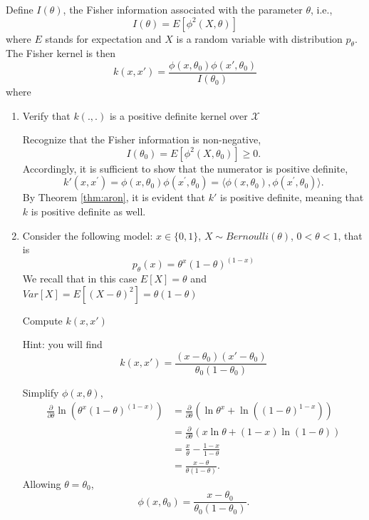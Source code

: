 \documentclass{article}[12pt]
\begin{document}
Define $I(\theta)$, the Fisher information associated with the parameter $\theta$, i.e., 
\begin{equation}
I(\theta)=E[\phi^2(X,\theta)]
\end{equation}
where $E$ stands for expectation and $X$ is a random variable with distribution $p_\theta$. 
The Fisher kernel is then 
\begin{equation}
k(x,x')=\frac{\phi(x,\theta_0)\phi(x',\theta_0)}{I(\theta_0)}
\end{equation}
where 
\begin{enumerate}
\item Verify that $k(.,.)$ is a positive definite kernel over $\mathcal{X}$

Recognize that the Fisher information is non-negative,
\begin{equation}
I(\theta_0)=E\left[\phi^{2}(X, \theta_0)\right] \ge 0.
\end{equation}
Accordingly, it is sufficient to show that the numerator is positive definite,
\begin{equation}
k'\left(x, x^{\prime}\right)=\phi\left(x, \theta_{0}\right) \phi\left(x^{\prime}, \theta_{0}\right) = \langle\phi\left(x, \theta_{0}\right), \phi\left(x^{\prime}, \theta_{0}\right) \rangle.
\end{equation}
By Theorem \ref{thm:aron}, it is evident that $k'$ is positive definite, meaning that $k$ is positive definite as well.

\item Consider the following model: $x \in \{0,1\}$, $X \sim Bernoulli(\theta)$, $0 < \theta < 1$, that is
\begin{equation}
p_\theta(x)=\theta^x(1-\theta)^{(1-x)} 
\end{equation}
We recall that in this case $E[X]=\theta$ and $Var[X]=E[(X-\theta)^2]=\theta(1-\theta)$

Compute $k(x,x')$

Hint: you will find $$k(x,x')=\frac{(x-\theta_0)(x'-\theta_0)}{\theta_0(1-\theta_0)}$$

Simplify $\phi(x, \theta)$,
\begin{equation}
\begin{aligned}
\frac{\partial }{\partial \theta} \ln \left(\theta^{x}(1-\theta)^{(1-x)} \right) &= \frac{\partial }{\partial \theta} \left( \ln \theta^x + \ln \left( \left( 1- \theta \right)^{1-x}\right)\right)  \\
&= \frac{\partial }{\partial \theta} \left( x\ln \theta + \left( 1- x \right)\ln \left(  1- \theta \right)\right) \\
&= \frac{x}{\theta} - \frac{1-x}{1-\theta} \\
&= \frac{x-\theta}{\theta(1-\theta)}.
\end{aligned}
\end{equation}
Allowing $\theta=\theta_0$,
\begin{equation}
\phi\left(x, \theta_{0}\right) = \frac{x-\theta_0}{\theta_0 \left( 1- \theta_0 \right)}.
\end{equation}


\end{enumerate}
\end{document}
